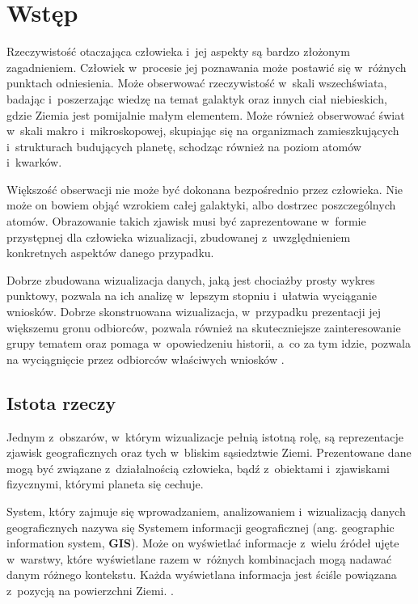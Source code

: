 \chapter{Wstęp}

Rzeczywistość otaczająca człowieka i~jej aspekty są bardzo złożonym zagadnieniem. Człowiek w~procesie jej poznawania może postawić się w~różnych punktach odniesienia. Może obserwować rzeczywistość w~skali wszechświata, badając i~poszerzając wiedzę na temat galaktyk oraz innych ciał niebieskich, gdzie Ziemia jest pomijalnie małym elementem. Może również obserwować świat w~skali makro i~mikroskopowej, skupiając się na organizmach zamieszkujących i~strukturach budujących planetę, schodząc również na poziom atomów i~kwarków. 

Większość obserwacji nie może być dokonana bezpośrednio przez człowieka. Nie może on bowiem objąć wzrokiem całej galaktyki, albo dostrzec poszczególnych atomów. Obrazowanie takich zjawisk musi być zaprezentowane w~formie przystępnej dla człowieka wizualizacji, zbudowanej z~uwzględnieniem konkretnych aspektów danego przypadku. 

Dobrze zbudowana wizualizacja danych, jaką jest chociażby prosty wykres punktowy, pozwala na ich analizę w~lepszym stopniu i~ułatwia wyciąganie wniosków. Dobrze skonstruowana wizualizacja, w~przypadku prezentacji jej większemu gronu odbiorców, pozwala również na skuteczniejsze zainteresowanie grupy tematem oraz pomaga w~opowiedzeniu historii, a~co za tym idzie, pozwala na wyciągnięcie przez odbiorców właściwych wniosków \cite{StorytellingWithData}.

\section{Istota rzeczy}

Jednym z~obszarów, w~którym wizualizacje pełnią istotną rolę, są reprezentacje zjawisk geograficznych oraz tych w~bliskim sąsiedztwie Ziemi. Prezentowane dane mogą być związane z~działalnością człowieka, bądź z~obiektami i~zjawiskami fizycznymi, którymi planeta się cechuje.

System, który zajmuje się wprowadzaniem, analizowaniem i~wizualizacją danych geograficznych nazywa się Systemem informacji geograficznej (ang. geographic information system, \textbf{GIS}). Może on wyświetlać informacje z~wielu źródeł ujęte w~warstwy, które wyświetlane razem w~różnych kombinacjach mogą nadawać danym różnego kontekstu. Każda wyświetlana informacja jest ściśle powiązana z~pozycją na powierzchni Ziemi. \cite[Rozdział 1.6]{IntroductionToHumanGeography}.

